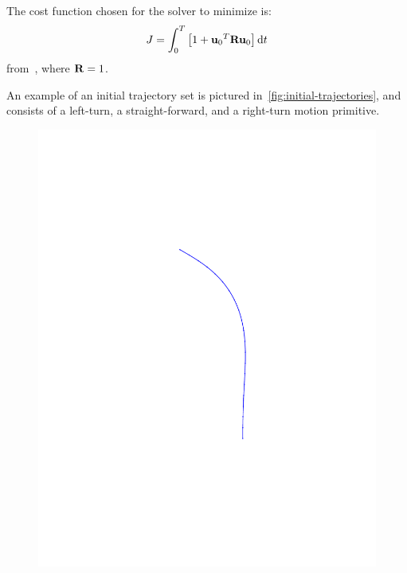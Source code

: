 The cost function chosen for the solver to minimize is:
\begin{equation}
  J = \int_{0}^{T} \left[ 1 + {\mathbf{u}_{0}}^{T} \mathbf{R} \mathbf{u}_{0} \right] \mathrm{d}t
\end{equation}
from~\cite{majumdarRobustOnlineMotion2013}, where \(\mathbf{R} = 1\).

An example of an initial trajectory set is pictured
in~\cref{fig:initial-trajectories}, and consists of a left-turn, a
straight-forward, and a right-turn motion primitive.

\begin{figure}
  \begin{minipage}[b]{0.3\textwidth}
    \includegraphics[trim={5cm 5cm 5cm 5cm},
    width=\textwidth]{figures/method/left-trajector}
  \end{minipage}
  \hfill
  \begin{minipage}[b]{0.3\textwidth}

\end{minipage}
\end{figure}
